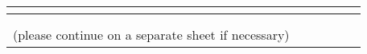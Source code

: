 \documentclass[a4paper,10pt, total={10.95in, 8in}]{article} %
\begin{document}
\begin{table}[H]
\begin{adjustbox}{width=6.5in}
\begin{tabular}{|p{4cm}|c|c|c|c|c|}
                                                                                                                                                   &                                                                                  &                                                                                                 & \textbf{}                                                                                 &                                                             &                                                                                        \\ \hline
                                                                                                                                                   &                                                                                  &                                                                                                 &                                                                                           &                                                             &                                                                                        \\ \hline
                                                                                                                                                   &                                                                                  &                                                                                                 &                                                                                           &                                                             &                                                                                        \\ \hline
(please continue on a separate sheet if necessary)                                                                                                 &                                                                                  &                                                                                                 &                                                                                           &                                                             &                                                                                        \\ \hline
\end{tabular}
\end{adjustbox}
\end{table}
\end{document}

